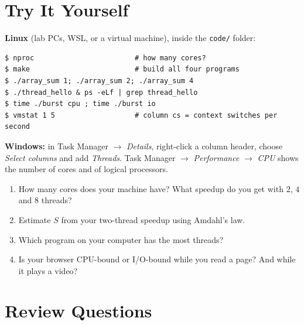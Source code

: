 \documentclass[11pt,a4paper]{article}
\begin{document}
\section{Try It Yourself}

\begin{tryit}
\textbf{Linux} (lab PCs, WSL, or a virtual machine), inside the \texttt{code/} folder:
\begin{lstlisting}[style=term]
$ nproc                        # how many cores?
$ make                         # build all four programs
$ ./array_sum 1; ./array_sum 2; ./array_sum 4
$ ./thread_hello & ps -eLf | grep thread_hello
$ time ./burst cpu ; time ./burst io
$ vmstat 1 5                   # column cs = context switches per second
\end{lstlisting}
\textbf{Windows:} in Task Manager $\to$ \emph{Details}, right-click a column header, choose \emph{Select columns} and add \emph{Threads}. Task Manager $\to$ \emph{Performance} $\to$ \emph{CPU} shows the number of cores and of logical processors.
\begin{enumerate}[leftmargin=1.4em]
  \item How many cores does your machine have? What speedup do you get with $2$, $4$ and $8$ threads?
  \item Estimate $S$ from your two-thread speedup using Amdahl's law.
  \item Which program on your computer has the most threads?
  \item Is your browser CPU-bound or I/O-bound while you read a page? And while it plays a video?
\end{enumerate}
\end{tryit}

\section{Review Questions}
\end{document}

